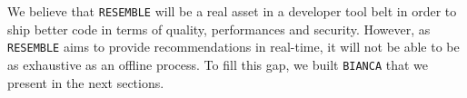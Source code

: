 We believe that {\tt RESEMBLE} will be a real asset in a developer tool belt in order to ship better code in terms of quality, performances and security.
However, as {\tt RESEMBLE} aims to provide recommendations in real-time, it will not be able to be as exhaustive as an offline process.
To fill this gap, we built {\tt BIANCA} that we present in the next sections.
